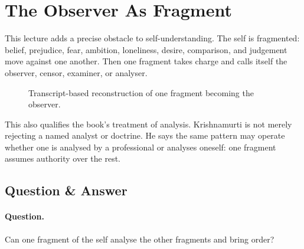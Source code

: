 \documentclass[11pt,oneside]{book}
\begin{document}
\section{The Observer As Fragment}

This lecture adds a precise obstacle to self-understanding. The self is fragmented: belief, prejudice, fear, ambition, loneliness, desire, comparison, and judgement move against one another. Then one fragment takes charge and calls itself the observer, censor, examiner, or analyser.

\begin{figure}
\centering
{}

Transcript-based reconstruction of one fragment becoming the observer.
\end{figure}

This also qualifies the book's treatment of analysis. Krishnamurti is not merely rejecting a named analyst or doctrine. He says the same pattern may operate whether one is analysed by a professional or analyses oneself: one fragment assumes authority over the rest.

\subsection{Question \& Answer}

\paragraph{Question.}
Can one fragment of the self analyse the other fragments and bring order?
\end{document}

